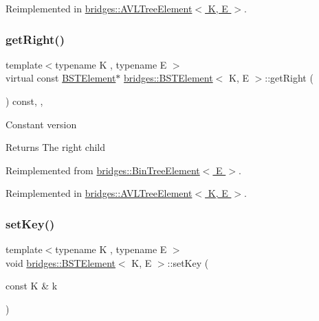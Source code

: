 Reimplemented in \hyperlink{classbridges_1_1_a_v_l_tree_element_a909b46ebf3e8c6a3434762a1f01499e2}{bridges\+::\+A\+V\+L\+Tree\+Element$<$ K, E $>$}.

\hypertarget{classbridges_1_1_b_s_t_element_ae4e7b750eada97074a42e7f54b320a29}{}\label{classbridges_1_1_b_s_t_element_ae4e7b750eada97074a42e7f54b320a29} 
\subsubsection{\texorpdfstring{get\+Right()}{getRight()}\hspace{0.1cm}{\footnotesize\ttfamily [2/2]}}
{\footnotesize\ttfamily template$<$typename K , typename E $>$ \\
virtual const \hyperlink{classbridges_1_1_b_s_t_element}{B\+S\+T\+Element}$\ast$ \hyperlink{classbridges_1_1_b_s_t_element}{bridges\+::\+B\+S\+T\+Element}$<$ K, E $>$\+::get\+Right (\begin{DoxyParamCaption}{ }\end{DoxyParamCaption}) const\hspace{0.3cm}{\ttfamily [inline]}, {\ttfamily [override]}, {\ttfamily [virtual]}}

Constant version

\begin{DoxyReturn}{Returns}
The right child 
\end{DoxyReturn}


Reimplemented from \hyperlink{classbridges_1_1_bin_tree_element_aa01980f4be18f6c205580ea0376a0d07}{bridges\+::\+Bin\+Tree\+Element$<$ E $>$}.



Reimplemented in \hyperlink{classbridges_1_1_a_v_l_tree_element_a2f6fd127f3a04fcc5be60299b7d98f12}{bridges\+::\+A\+V\+L\+Tree\+Element$<$ K, E $>$}.

\hypertarget{classbridges_1_1_b_s_t_element_ae9edfa178c3b2d8bbaa7bd248bc469ce}{}\label{classbridges_1_1_b_s_t_element_ae9edfa178c3b2d8bbaa7bd248bc469ce} 
\subsubsection{\texorpdfstring{set\+Key()}{setKey()}}
{\footnotesize\ttfamily template$<$typename K , typename E $>$ \\
void \hyperlink{classbridges_1_1_b_s_t_element}{bridges\+::\+B\+S\+T\+Element}$<$ K, E $>$\+::set\+Key (\begin{DoxyParamCaption}\item[{const K \&}]{k }\end{DoxyParamCaption})\hspace{0.3cm}{\ttfamily [inline]}}

